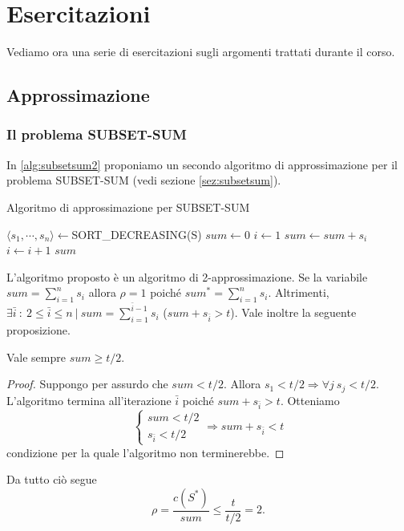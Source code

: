 \chapter{Esercitazioni}
Vediamo ora una serie di esercitazioni sugli argomenti trattati durante il corso.

\section{Approssimazione}
\subsection{Il problema SUBSET-SUM}
In \ref{alg:subsetsum2} proponiamo un secondo algoritmo di approssimazione per il problema SUBSET-SUM (vedi sezione \ref{sez:subsetsum}).

\begin{algorithm}
\caption{Algoritmo di approssimazione per SUBSET-SUM}
\label{alg:subsetsum2}
\begin{algorithmic}
   \State $\langle s_1, \cdots, s_n \rangle \gets$SORT\_DECREASING(S)
   \State $sum\gets 0$
   \State $i\gets 1$
      \State $sum \gets sum + s_i$
      \State $i \gets i + 1$
   \EndWhile
   \State \Return $sum$
\EndFunction
\end{algorithmic}
\end{algorithm}

L'algoritmo proposto è un algoritmo di 2-approssimazione. Se la variabile $sum=\sum_{i=1}^n s_i$ allora $\rho=1$ poiché $sum^*=\sum_{i=1}^n s_i$. Altrimenti, $\exists\bar{i}\ :\ 2\leq \bar{i} \leq n\ |\ sum=\sum_{i=1}^{\bar{i}-1}s_i$ ($sum+s_{\bar{i}}>t$). Vale inoltre la seguente proposizione.
\begin{proposizione}
Vale sempre $sum\geq t/2$.
\end{proposizione}
\begin{proof}
Suppongo per assurdo che $sum<t/2$. Allora $s_1<t/2 \Rightarrow \forall j\ s_j<t/2$. L'algoritmo termina all'iterazione $\bar{i}$ poiché $sum+s_{\bar{i}}>t$. Otteniamo
\[
\begin{cases}
sum < t/2 \\
s_{\bar{i}}<t/2
\end{cases}
\Rightarrow sum+s_{\bar{i}}<t
\]
condizione per la quale l'algoritmo non terminerebbe.
\end{proof}

Da tutto ciò segue
\[
\rho = \frac{c(S^*)}{sum} \leq \frac{t}{t/2} = 2.
\]

